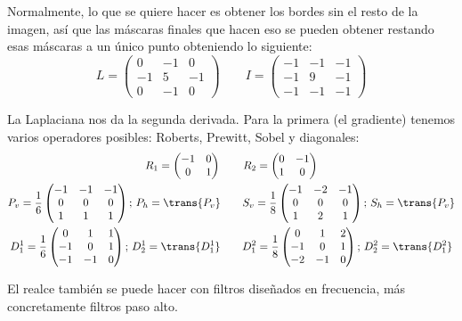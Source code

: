 \documentclass[nochap,palatino]{apuntes}
\begin{document}
Normalmente, lo que se quiere hacer es obtener los bordes sin el resto de la imagen, así que las máscaras finales que hacen eso se pueden obtener restando esas máscaras a un único punto obteniendo lo siguiente:
\[
L = \begin{pmatrix} 0 & -1 & 0 \\ -1 & 5 & -1 \\ 0 & -1 & 0 \end{pmatrix}
\qquad
I = \begin{pmatrix} -1 & -1 & -1 \\ -1 & 9 & -1 \\ -1 & -1 & -1 \end{pmatrix}
\]

La Laplaciana nos da la segunda derivada. Para la primera (el gradiente) tenemos varios operadores posibles: Roberts, Prewitt, Sobel y diagonales:
\begin{gather*}
R_1 = \begin{pmatrix} - 1 & 0 \\ 0 & 1 \end{pmatrix} \qquad R_2 = \begin{pmatrix}0 & -1 \\ 1 & 0 \end{pmatrix} \\
P_v = \frac{1}{6} \begin{pmatrix} -1 & -1 & -1 \\ 0 & 0 & 0 \\ 1 & 1 & 1 \end{pmatrix};\,P_h = \trans{P_v}
\qquad
S_v = \frac{1}{8} \begin{pmatrix} -1 & -2 & -1 \\ 0 & 0 & 0 \\ 1 & 2 & 1 \end{pmatrix};\,S_h = \trans{P_v} \\
D^1_1 = \frac{1}{6} \begin{pmatrix} 0 & 1 & 1 \\ -1 & 0 & 1 \\ -1 & -1 & 0 \end{pmatrix};\,D^1_2 = \trans{D^1_1} \qquad
D^2_1 = \frac{1}{8} \begin{pmatrix} 0 & 1 & 2 \\ -1 & 0 & 1 \\ -2 & -1 & 0 \end{pmatrix};\,D^2_2 = \trans{D^2_1}
\end{gather*}

El realce también se puede hacer con filtros diseñados en frecuencia, más concretamente filtros paso alto.
\end{document}
